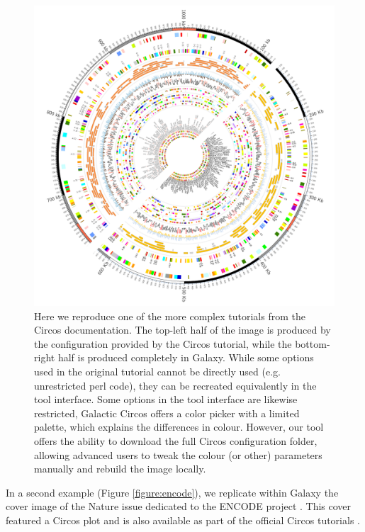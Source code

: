 \begin{figure}[h!]
\centering
\includegraphics[width=0.8\linewidth]{chapters/images/circos/plot-microbe-both.png}
	\caption{Here we reproduce one of the more complex tutorials from the Circos documentation. The top-left half of the image is produced by the configuration provided by the Circos tutorial, while the bottom-right half is produced completely in Galaxy. While some options used in the original tutorial cannot be directly used (e.g. unrestricted perl code), they can be recreated equivalently in the tool interface. Some options in the tool interface are likewise restricted, Galactic Circos offers a color picker with a limited palette, which explains the differences in colour. However, our tool offers the ability to download the full Circos configuration folder, allowing advanced users to tweak the colour (or other) parameters manually and rebuild the image locally.}\label{figure:microbe}
\end{figure}

In a second example (Figure \ref{figure:encode}), we replicate within Galaxy the cover image of the Nature issue \cite{nature-encode} dedicated to the ENCODE project \cite{encode2004encode}. This cover featured a Circos plot and is also available as part of the official Circos tutorials \cite{circos-nature-example}.

